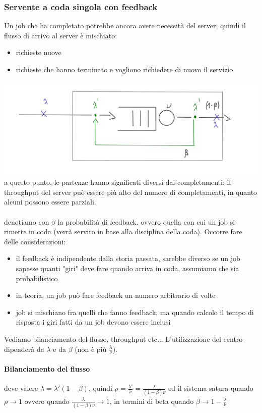\documentclass{article}
\begin{document}
\subsubsection{Servente a coda singola con feedback}
Un job che ha completato potrebbe ancora avere necessità del server, quindi il flusso di arrivo al server è mischiato:
\begin{itemize}
\item richieste nuove
\item richieste che hanno terminato e vogliono richiedere di nuovo il servizio
\end{itemize}
\includegraphics[scale=0.3]{images/PMCSN-1603-1.2.jpeg}\\
a questo punto, le partenze hanno significati diversi dai completamenti: il throughput del server può essere più alto del numero di completamenti, in quanto alcuni possono essere parziali.\\
\\ denotiamo con $\beta$ la probabilità di feedback, ovvero quella con cui un job si rimette in coda (verrà servito in base alla disciplina della coda). Occorre fare delle considerazioni:
\begin{itemize}
\item il feedback è indipendente dalla storia passata, sarebbe diverso se un job sapesse quanti "giri" deve fare quando arriva in coda, assumiamo che sia probabilistico
\item in teoria, un job può fare feedback un numero arbitrario di volte
\item job si mischiano fra quelli che fanno feedback, ma quando calcolo il tempo di risposta i giri fatti da un job devono essere inclusi
\end{itemize}
Vediamo bilanciamento del flusso, throughput etc... L'utilizzazione del centro dipenderà da $\lambda$ e da $\beta$ (non è più $\frac{\lambda}{\nu}$).
\paragraph{Bilanciamento del flusso} deve valere $\lambda = \lambda'(1 - \beta)$, quindi $\rho = \frac{\lambda'}{\nu} = \frac{\lambda}{(1 - \beta)\nu}$ ed il sistema satura quando $\rho \longrightarrow 1$ ovvero quando $\frac{\lambda}{(1 - \beta)\nu} \longrightarrow 1$, in termini di beta quando $\beta \longrightarrow 1 - \frac{\lambda}{\nu}$
\end{document}
